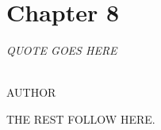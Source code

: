 \chapter{Chapter 8}\label{chp:chp8}

\begin{flushright}
  {\em QUOTE GOES HERE }\\

\ \

\normalsize
{AUTHOR}  
\end{flushright}



THE REST FOLLOW HERE. 


